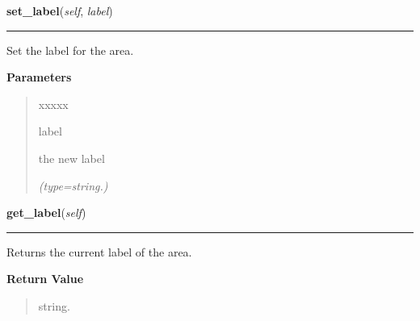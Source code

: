     \label{pygtk_chart:chart:Area:set_label}

    \vspace{0.5ex}

\hspace{.8\funcindent}\begin{boxedminipage}{\funcwidth}

    \raggedright \textbf{set\_label}(\textit{self}, \textit{label})

    \vspace{-1.5ex}

    \rule{\textwidth}{0.5\fboxrule}
\setlength{\parskip}{2ex}
    Set the label for the area.

\setlength{\parskip}{1ex}
      \textbf{Parameters}
      \vspace{-1ex}

      \begin{quote}
        \begin{Ventry}{xxxxx}

          \item[label]

          the new label

            {\it (type=string.)}

        \end{Ventry}

      \end{quote}

    \end{boxedminipage}

    \label{pygtk_chart:chart:Area:get_label}

    \vspace{0.5ex}

\hspace{.8\funcindent}\begin{boxedminipage}{\funcwidth}

    \raggedright \textbf{get\_label}(\textit{self})

    \vspace{-1.5ex}

    \rule{\textwidth}{0.5\fboxrule}
\setlength{\parskip}{2ex}
    Returns the current label of the area.

\setlength{\parskip}{1ex}
      \textbf{Return Value}
    \vspace{-1ex}

      \begin{quote}
      string.

      \end{quote}

    \end{boxedminipage}

